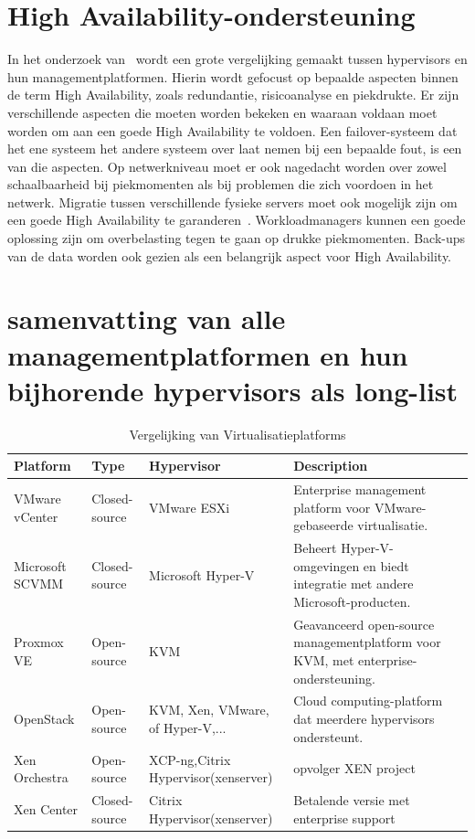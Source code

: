 \section{High Availability-ondersteuning}
In het onderzoek van~\textcite{dudnik2017creating} wordt een grote vergelijking gemaakt tussen hypervisors en hun managementplatformen. Hierin wordt gefocust op bepaalde aspecten binnen de term High Availability, zoals redundantie, risicoanalyse en piekdrukte.
Er zijn verschillende aspecten die moeten worden bekeken en waaraan voldaan moet worden om aan een goede High Availability te voldoen. Een failover-systeem dat het ene systeem het andere systeem over laat nemen bij een bepaalde fout, is een van die aspecten.
Op netwerkniveau moet er ook nagedacht worden over zowel schaalbaarheid bij piekmomenten als bij problemen die zich voordoen in het netwerk. Migratie tussen verschillende fysieke servers moet ook mogelijk zijn om een goede High Availability te garanderen~\autocite{dudnik2017creating}.
Workloadmanagers kunnen een goede oplossing zijn om overbelasting tegen te gaan op drukke piekmomenten. Back-ups van de data worden ook gezien als een belangrijk aspect voor High Availability.


\section{samenvatting van alle managementplatformen en hun bijhorende hypervisors als long-list}
    \begin{table}[h!]
        \centering
        \begin{tabular}{|l|l|l|l|l|}
        \hline
        \textbf{Platform}      & \textbf{Type}      & \textbf{Hypervisor} & \textbf{Description} \\ \hline
        VMware vCenter         & Closed-source      & VMware ESXi         & Enterprise management platform voor VMware-gebaseerde virtualisatie. \\ \hline
        Microsoft SCVMM        & Closed-source      & Microsoft Hyper-V   & Beheert Hyper-V-omgevingen en biedt integratie met andere Microsoft-producten. \\ \hline
        Proxmox VE             & Open-source        & KVM                 & Geavanceerd open-source managementplatform voor KVM, met enterprise-ondersteuning. \\ \hline
        OpenStack              & Open-source        & KVM, Xen, VMware, of Hyper-V,...  & Cloud computing-platform dat meerdere hypervisors ondersteunt. \\ \hline
        Xen Orchestra  & Open-source & XCP-ng,Citrix Hypervisor(xenserver)  & opvolger XEN project \\ \hline
        Xen Center  & Closed-source & Citrix Hypervisor(xenserver)   &  Betalende versie met enterprise support\\ 
        \end{tabular}
        \caption{Vergelijking van Virtualisatieplatforms}
        \end{table}
        
